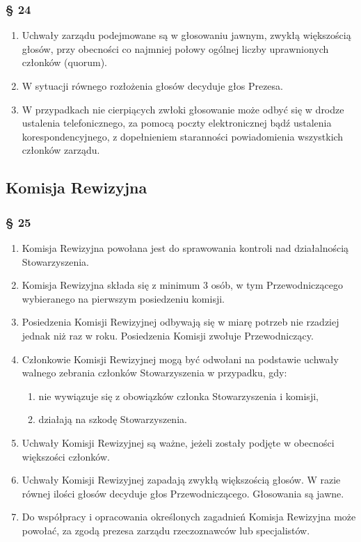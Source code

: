 \documentclass{article}
\newcommand{\myparagraph}[1]{\subsubsection*{#1}}
\begin{document}
\myparagraph{§ 24}
\begin{enumerate}
\item
  Uchwały zarządu podejmowane są w głosowaniu jawnym, zwykłą większością głosów, przy obecności co najmniej połowy ogólnej liczby uprawnionych
  członków (quorum).
\item
  W sytuacji równego rozłożenia głosów decyduje głos Prezesa.
\item
  W przypadkach nie cierpiących zwłoki głosowanie może odbyć się w drodze ustalenia telefonicznego, za pomocą poczty elektronicznej bądź ustalenia korespondencyjnego, z dopełnieniem staranności powiadomienia wszystkich członków zarządu.
\end{enumerate}

\subsection*{Komisja Rewizyjna}
\myparagraph{§ 25}
\begin{enumerate}
\item
  Komisja Rewizyjna powołana jest do sprawowania kontroli nad działalnością Stowarzyszenia.
\item
  Komisja Rewizyjna składa się z minimum 3 osób, w tym Przewodniczącego wybieranego na pierwszym posiedzeniu komisji.
\item
  Posiedzenia Komisji Rewizyjnej odbywają się w miarę potrzeb nie rzadziej jednak niż raz w roku. Posiedzenia Komisji zwołuje Przewodniczący.
\item
  Członkowie Komisji Rewizyjnej mogą być odwołani na podstawie uchwały walnego zebrania członków Stowarzyszenia w przypadku, gdy:
  \begin{enumerate}
  \def\labelenumii{\alph{enumii}.}
  \item
    nie wywiązuje się z obowiązków członka Stowarzyszenia i komisji,
  \item
    działają na szkodę Stowarzyszenia.
  \end{enumerate}
\item
  Uchwały Komisji Rewizyjnej są ważne, jeżeli zostały podjęte w obecności większości członków.
\item
  Uchwały Komisji Rewizyjnej zapadają zwykłą większością głosów. W razie równej ilości głosów decyduje głos Przewodniczącego. Głosowania są jawne.
\item
  Do współpracy i opracowania określonych zagadnień Komisja Rewizyjna może powołać, za zgodą prezesa zarządu rzeczoznawców lub specjalistów.
\end{enumerate}
\end{document}
